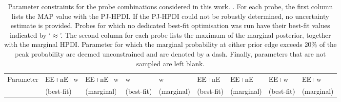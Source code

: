 \begin{landscape}
\begin{table}
\begin{center}
\caption{Parameter constraints for the probe combinations considered in this work. . 
For each probe, the first column lists the MAP value with the PJ-HPDI. 
If the PJ-HPDI could not be robustly determined, no uncertainty estimate is provided. 
Probes for which no dedicated best-fit optimisation was run have their best-fit values indicated by `$\approx$'.
The second column for each probe lists the maximum of the marginal posterior, together with the marginal HPDI. 
Parameter for which the marginal probability at either prior edge exceeds 20\% of the peak probability are deemed unconstrained and are denoted by a dash. 
Finally, parameters that are not sampled are left blank.
\label{tab:fullparams}}
\begin{tabular}{lllllllll}
    \toprule
    Parameter    & EE+nE+w & EE+nE+w& w & w& EE+nE & EE+nE& EE+w & EE+w \\ 
             & (best-fit) & (marginal)& (best-fit) & (marginal)& (best-fit) & (marginal)& (best-fit) & (marginal) \\ 


\end{tabular}
\end{center}
\end{table}
\end{landscape}

